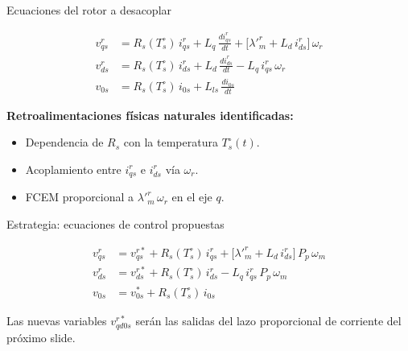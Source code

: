 \documentclass[aspectratio=169,t]{beamer}
\begin{document}
\begin{frame}{Ecuaciones del rotor a desacoplar}
\vspace{2mm}

\begin{align*}
v_{qs}^{r} &= R_s(T_s^\circ)\,i_{qs}^{r} + L_q\,\tfrac{d i_{qs}^{r}}{dt} + \big[\lambda'^r_m + L_d\,i_{ds}^{r}\big]\,\omega_r \\[3pt]
v_{ds}^{r} &= R_s(T_s^\circ)\,i_{ds}^{r} + L_d\,\tfrac{d i_{ds}^{r}}{dt} - L_q\,i_{qs}^{r}\,\omega_r \\[3pt]
v_{0s} &= R_s(T_s^\circ)\,i_{0s} + L_{ls}\,\tfrac{d i_{0s}}{dt}
\end{align*}

\vspace{2mm}
\textbf{Retroalimentaciones físicas naturales identificadas:}
\begin{itemize}
\item Dependencia de $R_s$ con la temperatura $T_s^\circ(t)$.
\item Acoplamiento entre $i_{qs}^{r}$ e $i_{ds}^{r}$ vía $\omega_r$.
\item FCEM proporcional a $\lambda'^r_m\,\omega_r$ en el eje $q$.
\end{itemize}
\end{frame}

\begin{frame}{Estrategia: ecuaciones de control propuestas}
\vspace{2mm}

\begin{align*}
v_{qs}^{r} &= v_{qs}^{r*} + R_s(T_s^\circ)\,i_{qs}^{r} + \big[\lambda'^r_m + L_d\,i_{ds}^{r}\big]\,P_p\,\omega_m \\[3pt]
v_{ds}^{r} &= v_{ds}^{r*} + R_s(T_s^\circ)\,i_{ds}^{r} - L_q\,i_{qs}^{r}\,P_p\,\omega_m \\[3pt]
v_{0s} &= v_{0s}^{*} + R_s(T_s^\circ)\,i_{0s}
\end{align*}

\vspace{2mm}
{\small Las nuevas variables $v_{qd0s}^{r*}$ serán las salidas del lazo proporcional de corriente del próximo slide.}
\end{frame}
\end{document}
